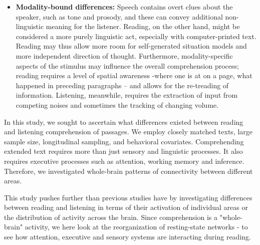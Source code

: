 \begin{itemize}
	\item \textbf{Modality-bound differences:} Speech contains overt clues about the speaker, such as tone and prosody, and these can convey additional non-linguistic meaning for the listener. Reading, on the other hand, might be considered a more purely linguistic act, especially with computer-printed text. Reading may thus allow more room for self-generated situation models and more independent direction of thought. Furthermore, modality-specific aspects of the stimulus may influence the overall comprehension process; reading requires a level of spatial awareness -where one is at on a page, what happened in preceding paragraphs – and allows for the re-treading of information. Listening, meanwhile, requires the extraction of input from competing noises and sometimes the tracking of changing volume. 
\end{itemize}

In this study, we sought to ascertain what differences existed between reading and listening comprehension of passages. We employ closely matched texts, large sample size, longitudinal sampling, and behavioral covariates. Comprehending extended text requires more than just sensory and linguistic processes. It also requires executive processes such as attention, working memory and inference. Therefore, we investigated whole-brain patterns of connectivity between different areas. 

This study pushes further than previous studies have by investigating differences between reading and listening in terms of their activation of individual areas or the distribution of activity across the brain. Since comprehension is a "whole-brain" activity, we here look at the reorganization of resting-state networks - to see how attention, executive and sensory systems are interacting during reading.
